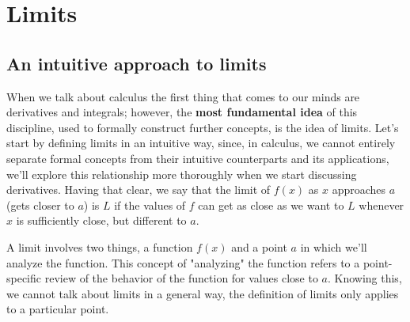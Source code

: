 \documentclass{report}
\begin{document}
\tableofcontents

\pagebreak
\chapter{ Limits }

\section{An intuitive approach to limits}
When we talk about calculus the first thing that comes to our minds are derivatives and integrals; however, the \textbf{most fundamental idea} of this discipline, used to formally construct further concepts, is the idea of limits. Let's start by defining limits in an intuitive way, since, in calculus, we cannot entirely separate formal concepts from their intuitive counterparts and its applications, we'll explore this relationship more thoroughly when we start discussing derivatives. Having that clear, we say that the limit of $f(x)$ as $x$ approaches $a$ (gets closer to $a$) is $L$ if the values of $f$ can get as close as we want to $L$ whenever $x$ is sufficiently close, but different to $a$.

A limit involves two things, a function $f(x)$ and a point $a$ in which we'll analyze the function. This concept of "analyzing" the function refers to a point-specific review of the behavior of the function for values close to $a$. Knowing this, we cannot talk about limits in a general way, the definition of limits only applies to a particular point.
\end{document}
